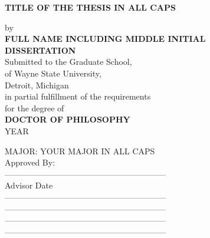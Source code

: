 \centerline{\bf TITLE OF THE THESIS IN ALL CAPS} %

\vskip-0.4cm

\thispagestyle{empty}

\begin{center}
  \vspace{-0.4cm}
	by \\
	\Vspc
	{\bf FULL NAME INCLUDING MIDDLE INITIAL}\\ %
	\Vspc
	{\bf DISSERTATION}\\
	\Vspc
    Submitted to the Graduate School,\\
	of Wayne State University,\\
	Detroit, Michigan\\
	in partial fulfillment of the requirements\\
	for the degree of\\
	\Vspc
	{\bf DOCTOR OF PHILOSOPHY}\\
	YEAR %
\end{center}

{
	\setlength{\baselineskip}{0.30in}
	\begin{flushleft}
		\hspace*{3.09in}MAJOR: YOUR MAJOR IN ALL CAPS\\ %
		\Vspc
		\hspace*{3.09in}Approved By:\\
		\Vspc
		\hspace*{3.09in}-----------------------------------------------------------\\
		\vspace*{-0.1in}
		\hspace*{3.09in}Advisor\hspace*{1.5in} Date\hspace*{0.1in}\\
		\bigskip
		\hspace*{3.09in}-----------------------------------------------------------\\
		\medskip
		\hspace*{3.09in}-----------------------------------------------------------\\
		\medskip
		\hspace*{3.09in}-----------------------------------------------------------\\
		\medskip
		\hspace*{3.09in}-----------------------------------------------------------
	\end{flushleft}
}
